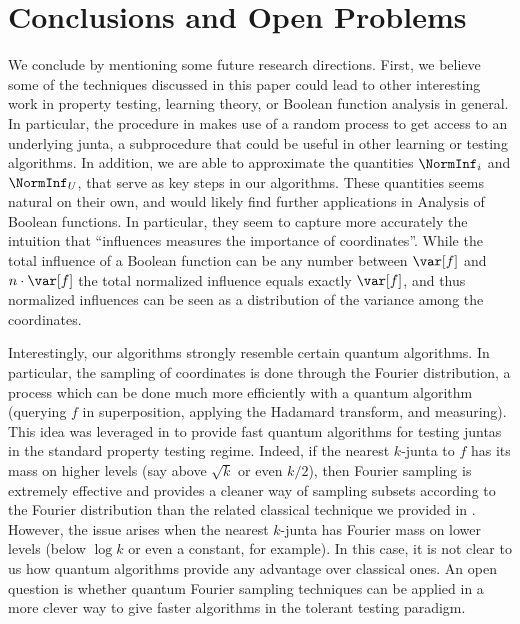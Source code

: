 \section{Conclusions and Open Problems}
\label{section:conclusion}


We conclude by mentioning some future research directions. First, we believe some of the techniques discussed in this paper could lead to other interesting work in property testing, learning theory, or Boolean function analysis in general. 
In particular, the procedure in  makes use of a random process to get access to an underlying junta, a subprocedure that could be useful in other learning or testing algorithms. 
In addition, we are able to approximate the quantities $\NormInf_i$ and $\NormInf_U$, that serve as key steps in our algorithms. These quantities seems natural on their own, and would likely find further applications in Analysis of Boolean functions. In particular, they seem to capture more accurately the intuition that ``influences measures the importance of coordinates''.
While the total influence of a Boolean function can be any number between $\var[f]$ and $n\cdot \var[f]$ the total normalized influence equals exactly $\var[f]$, and thus normalized influences can be seen as a distribution of the variance among the coordinates. 

Interestingly, our algorithms strongly resemble certain quantum algorithms. In particular, the sampling of coordinates is done through the Fourier distribution, a process which can be done much more efficiently with a quantum algorithm (querying $f$ in superposition, applying the Hadamard transform, and measuring). 
This idea was leveraged in \cite{quantum-junta-testing} to provide fast quantum algorithms for testing juntas in the standard property testing regime. 
Indeed, if the nearest $k$-junta to $f$ has its mass on higher levels (say above $\sqrt{k}$ or even $k/2$), then Fourier sampling is extremely effective and provides a cleaner way of sampling subsets according to the Fourier distribution than the related classical technique we provided in . However, the issue arises when the nearest $k$-junta has Fourier mass on lower levels (below $\log k$ or even a constant, for example). In this case, it is not clear to us how quantum algorithms provide any advantage over classical ones. 
An open question is whether quantum Fourier sampling techniques can be applied in a more clever way to give faster algorithms in the tolerant testing paradigm.

